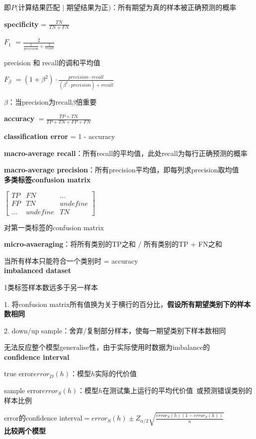 \documentclass[UTF8]{ctexart}
\begin{document}
  \quad \quad 即$P($计算结果匹配 $|$ 期望结果为正$)$：所有期望为真的样本被正确预测的概率

  \quad \textbf{specificity} = $\frac{TN}{TN + FN}$

  \quad \textbf{$F_1$} $= \frac{2}{\frac{1}{precision} + \frac{1}{recall}}$ 
  
  \quad \quad precision 和 recall的调和平均值

  \quad \textbf{$F_\beta$} $= (1 + \beta^2) \cdot \frac{precision \cdot recall}{(\beta^2 \cdot precision) + recall}$

  \quad \quad $\beta$：当precision为recall$\beta$倍重要

  \textbf{accuracy} $= \frac{TP + TN}{TP + TN + FP + FN}$

  \textbf{classification error} = 1 - accuracy
  
  \textbf{macro-average recall}：所有recall的平均值，此处recall为每行正确预测的概率

  \textbf{macro-average precision}：所有precision平均值，即每列求precision取均值\\
\textbf{多类标签confusion matrix}

  $\begin{bmatrix}
    TP & FN & ... \\
    FP & TN & undefine\\
    ... & undefine & TN
  \end{bmatrix}$
  
  对第一类标签的confusion matrix
  
  \textbf{micro-avaeraging}：将所有类别的TP之和 / 所有类别的TP + FN之和
  
  \quad 当所有样本只能符合一个类别时 = accuracy\\
\textbf{imbalanced dataset}

  1类标签样本数远多于另一样本
  
  1. 将confusion matrix所有值换为关于横行的百分比，\textbf{假设所有期望类别下的样本数相同}
  
  2. down/up sample：舍弃/复制部分样本，使每一期望类别下样本数相同
  
  \quad 无法反应整个模型generalise性，由于实际使用时数据为imbalance的\\
\textbf{confidence interval}

  true error$error_D(h)$：模型$h$实际的代价值

  sample error$error_S(h)$：模型$h$在测试集上运行的平均代价值\ 或预测错误类别的样本比例

  error的confidence interval$= error_S(h) \pm Z_{\alpha/2}\sqrt{\frac{error_S(h)(1-error_S(h))}{n}}$\\
\textbf{比较两个模型}
\end{document}

